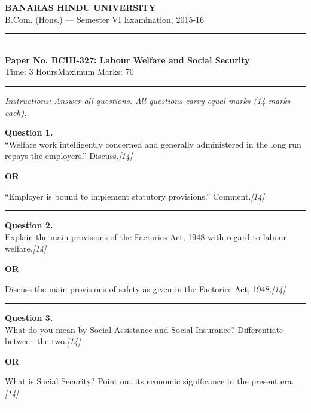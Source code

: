 \documentclass[11pt,a4paper]{article}
\newcommand{\pts}[1]{\hfill   \textit{[#1]}}
\begin{document}
\begin{center}
  {\large\bfseries BANARAS HINDU UNIVERSITY}\\[2pt]
  {\normalsize B.Com. (Hons.) --- Semester VI Examination, 2015-16}\\[6pt]
  \rule{0.8\linewidth}{0.5pt}\\[6pt]
  {\large\bfseries Paper No. BCHI-327: Labour Welfare and Social Security}\\[4pt]
  {\normalsize Time: 3 Hours\hfill Maximum Marks: 70}
\end{center}

\rule{\linewidth}{0.4pt}

\smallskip



\noindent   \textit{Instructions: Answer all questions. All questions carry equal marks (14 marks each).}

\bigskip




\noindent   \textbf{Question 1.} \\
``Welfare work intelligently concerned and generally administered in the long run repays the employers.'' Discuss.\pts{14}

\centerline{   \textbf{OR}}

``Employer is bound to implement statutory provisions.'' Comment.\pts{14}

\medskip\rule{\linewidth}{0.2pt}




\noindent   \textbf{Question 2.} \\
Explain the main provisions of the Factories Act, 1948 with regard to labour welfare.\pts{14}

\centerline{   \textbf{OR}}

Discuss the main provisions of safety as given in the Factories Act, 1948.\pts{14}

\medskip\rule{\linewidth}{0.2pt}

\pagebreak




\noindent   \textbf{Question 3.} \\
What do you mean by Social Assistance and Social Insurance? Differentiate between the two.\pts{14}

\centerline{   \textbf{OR}}

What is Social Security? Point out its economic significance in the present era.\pts{14}

\medskip\rule{\linewidth}{0.2pt}
\end{document}
